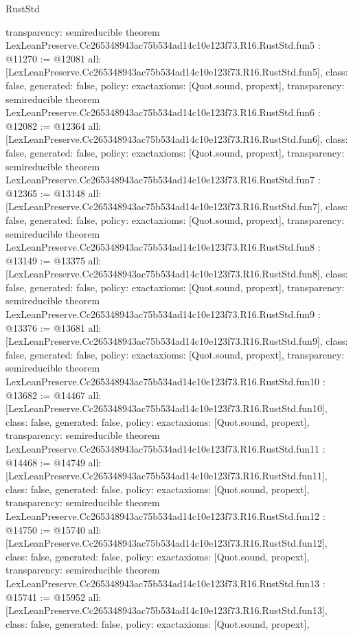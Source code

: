 \begin{lexlean}{RustStd}
\begin{coremodule}
{  transparency: semireducible
}
theorem LexLeanPreserve.Cc265348943ac75b534ad14c10e123f73.R16.RustStd.fun5 : @11270 := @12081 {
  all: [LexLeanPreserve.Cc265348943ac75b534ad14c10e123f73.R16.RustStd.fun5],
  class: false,
  generated: false,
  policy: exact{axioms: [Quot.sound, propext]},
  transparency: semireducible
}
theorem LexLeanPreserve.Cc265348943ac75b534ad14c10e123f73.R16.RustStd.fun6 : @12082 := @12364 {
  all: [LexLeanPreserve.Cc265348943ac75b534ad14c10e123f73.R16.RustStd.fun6],
  class: false,
  generated: false,
  policy: exact{axioms: [Quot.sound, propext]},
  transparency: semireducible
}
theorem LexLeanPreserve.Cc265348943ac75b534ad14c10e123f73.R16.RustStd.fun7 : @12365 := @13148 {
  all: [LexLeanPreserve.Cc265348943ac75b534ad14c10e123f73.R16.RustStd.fun7],
  class: false,
  generated: false,
  policy: exact{axioms: [Quot.sound, propext]},
  transparency: semireducible
}
theorem LexLeanPreserve.Cc265348943ac75b534ad14c10e123f73.R16.RustStd.fun8 : @13149 := @13375 {
  all: [LexLeanPreserve.Cc265348943ac75b534ad14c10e123f73.R16.RustStd.fun8],
  class: false,
  generated: false,
  policy: exact{axioms: [Quot.sound, propext]},
  transparency: semireducible
}
theorem LexLeanPreserve.Cc265348943ac75b534ad14c10e123f73.R16.RustStd.fun9 : @13376 := @13681 {
  all: [LexLeanPreserve.Cc265348943ac75b534ad14c10e123f73.R16.RustStd.fun9],
  class: false,
  generated: false,
  policy: exact{axioms: [Quot.sound, propext]},
  transparency: semireducible
}
theorem LexLeanPreserve.Cc265348943ac75b534ad14c10e123f73.R16.RustStd.fun10 : @13682 := @14467 {
  all: [LexLeanPreserve.Cc265348943ac75b534ad14c10e123f73.R16.RustStd.fun10],
  class: false,
  generated: false,
  policy: exact{axioms: [Quot.sound, propext]},
  transparency: semireducible
}
theorem LexLeanPreserve.Cc265348943ac75b534ad14c10e123f73.R16.RustStd.fun11 : @14468 := @14749 {
  all: [LexLeanPreserve.Cc265348943ac75b534ad14c10e123f73.R16.RustStd.fun11],
  class: false,
  generated: false,
  policy: exact{axioms: [Quot.sound, propext]},
  transparency: semireducible
}
theorem LexLeanPreserve.Cc265348943ac75b534ad14c10e123f73.R16.RustStd.fun12 : @14750 := @15740 {
  all: [LexLeanPreserve.Cc265348943ac75b534ad14c10e123f73.R16.RustStd.fun12],
  class: false,
  generated: false,
  policy: exact{axioms: [Quot.sound, propext]},
  transparency: semireducible
}
theorem LexLeanPreserve.Cc265348943ac75b534ad14c10e123f73.R16.RustStd.fun13 : @15741 := @15952 {
  all: [LexLeanPreserve.Cc265348943ac75b534ad14c10e123f73.R16.RustStd.fun13],
  class: false,
  generated: false,
  policy: exact{axioms: [Quot.sound, propext]},
}
\end{coremodule}
\end{lexlean}
